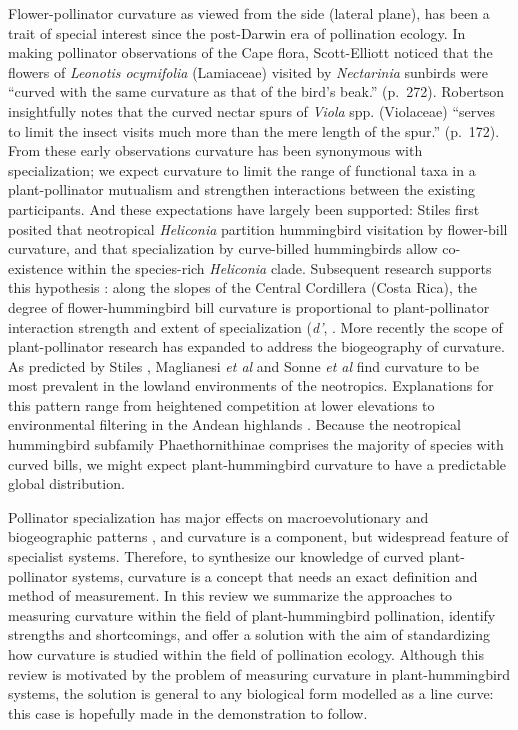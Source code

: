 \documentclass[letterpaper,9pt,twocolumn,twoside,]{pinp}
\begin{document}
Flower-pollinator curvature as viewed from the side (lateral plane), has
been a trait of special interest since the post-Darwin era of
pollination ecology. In making pollinator observations of the Cape
flora, Scott-Elliott \citeyearpar{scott-elliot_1890} noticed that the
flowers of \emph{Leonotis ocymifolia} (Lamiaceae) visited by
\emph{Nectarinia} sunbirds were ``curved with the same curvature as that
of the bird's beak.'' (p.~272). Robertson \citeyearpar{robertson_1889}
insightfully notes that the curved nectar spurs of \emph{Viola} spp.
(Violaceae) ``serves to limit the insect visits much more than the mere
length of the spur.'' (p.~172). From these early observations curvature
has been synonymous with specialization; we expect curvature to limit
the range of functional taxa in a plant-pollinator mutualism and
strengthen interactions between the existing participants. And these
expectations have largely been supported: Stiles
\citeyearpar{stiles_1975} first posited that neotropical
\emph{Heliconia} partition hummingbird visitation by flower-bill
curvature, and that specialization by curve-billed hummingbirds allow
co-existence within the species-rich \emph{Heliconia} clade. Subsequent
research supports this hypothesis \citep{maglianesi_2014}: along the
slopes of the Central Cordillera (Costa Rica), the degree of
flower-hummingbird bill curvature is proportional to plant-pollinator
interaction strength \citep{dehling_2014} and extent of specialization
(\emph{d'}, \citep{bluthgen_2006}. More recently the scope of
plant-pollinator research has expanded to address the biogeography of
curvature. As predicted by Stiles \citeyearpar{stiles_2004}, Maglianesi
\emph{et al} \citeyearpar{maglianesi_2015} and Sonne \emph{et al}
\citeyearpar{sonne_2019} find curvature to be most prevalent in the
lowland environments of the neotropics. Explanations for this pattern
range from heightened competition at lower elevations to environmental
filtering in the Andean highlands \citep{stiles_2004, graham_2009}.
Because the neotropical hummingbird subfamily Phaethornithinae comprises
the majority of species with curved bills, we might expect
plant-hummingbird curvature to have a predictable global distribution.

Pollinator specialization has major effects on macroevolutionary and
biogeographic patterns \citep{kay_2009, armbruster_2009, vamosi_2018},
and curvature is a component, but widespread feature of specialist
systems. Therefore, to synthesize our knowledge of curved
plant-pollinator systems, curvature is a concept that needs an exact
definition and method of measurement. In this review we summarize the
approaches to measuring curvature within the field of plant-hummingbird
pollination, identify strengths and shortcomings, and offer a solution
with the aim of standardizing how curvature is studied within the field
of pollination ecology. Although this review is motivated by the problem
of measuring curvature in plant-hummingbird systems, the solution is
general to any biological form modelled as a line curve: this case is
hopefully made in the demonstration to follow.
\end{document}
